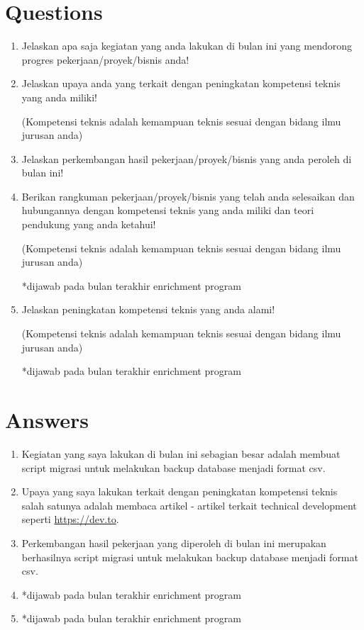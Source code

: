 \documentclass[12pt, letterpaper]{article}
\begin{document}
\section*{Questions}
\begin{enumerate}
    \item Jelaskan apa saja kegiatan yang anda lakukan di bulan ini yang mendorong progres pekerjaan/proyek/bisnis anda!
    \item Jelaskan upaya anda yang terkait dengan peningkatan kompetensi teknis yang anda miliki!
    
    (Kompetensi teknis adalah kemampuan teknis sesuai dengan bidang ilmu jurusan anda)
    \item Jelaskan perkembangan hasil pekerjaan/proyek/bisnis yang anda peroleh di bulan ini!
    \item Berikan rangkuman pekerjaan/proyek/bisnis yang telah anda selesaikan dan hubungannya dengan kompetensi teknis yang anda miliki dan teori pendukung yang anda ketahui!
    
    (Kompetensi teknis adalah kemampuan teknis sesuai dengan bidang ilmu jurusan anda)

    *dijawab pada bulan terakhir enrichment program
    \item Jelaskan peningkatan kompetensi teknis yang anda alami!
    
    (Kompetensi teknis adalah kemampuan teknis sesuai dengan bidang ilmu jurusan anda)
    
    *dijawab pada bulan terakhir enrichment program
\end{enumerate}

\section*{Answers}
\begin{enumerate}
    \item Kegiatan yang saya lakukan di bulan ini sebagian besar adalah membuat script migrasi untuk melakukan backup database menjadi format csv.
    \item Upaya yang saya lakukan terkait dengan peningkatan kompetensi teknis salah satunya adalah membaca artikel - artikel terkait technical development seperti \url{https://dev.to}.
    \item Perkembangan hasil pekerjaan yang diperoleh di bulan ini merupakan berhasilnya script migrasi untuk melakukan backup database menjadi format csv.
    \item *dijawab pada bulan terakhir enrichment program
    \item *dijawab pada bulan terakhir enrichment program
\end{enumerate}
\end{document}
